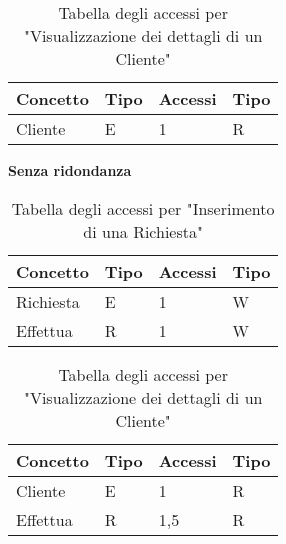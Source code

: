 \documentclass{article}
\begin{document}
\begin{table}[h]
    \centering
    \begin{adjustbox}{width=0.6\textwidth}
        \begin{tabular}{|m{2cm}|m{2cm}|m{2cm}|m{2cm}|}
            \hline  
            \textbf{Concetto} & \textbf{Tipo} & \textbf{Accessi} & \textbf{Tipo}\\ 
            \hline
            Cliente & E & 1 & R\\
            \hline
        \end{tabular}
    \end{adjustbox}
    \caption{Tabella degli accessi per "Visualizzazione dei dettagli di un Cliente"}
    \label{tab:accesstable2}
\end{table}

\textbf{Senza ridondanza}

\begin{table}[h]
    \centering
    \begin{adjustbox}{width=0.6\textwidth}
        \begin{tabular}{|m{2cm}|m{2cm}|m{2cm}|m{2cm}|}
            \hline  
            \textbf{Concetto} & \textbf{Tipo} & \textbf{Accessi} & \textbf{Tipo}\\ 
            \hline
            Richiesta & E & 1 & W\\
            \hline
            Effettua & R & 1 & W\\
            \hline
        \end{tabular}
    \end{adjustbox}
    \caption{Tabella degli accessi per "Inserimento di una Richiesta" }
    \label{tab:accesstable3}
\end{table}

\begin{table}[h!]
    \centering
    \begin{adjustbox}{width=0.6\textwidth}
        \begin{tabular}{|m{2cm}|m{2cm}|m{2cm}|m{2cm}|}
            \hline  
            \textbf{Concetto} & \textbf{Tipo} & \textbf{Accessi} & \textbf{Tipo}\\ 
            \hline
            Cliente & E & 1 & R\\
            \hline
            Effettua & R & 1,5 & R\\
            \hline
        \end{tabular}
    \end{adjustbox}
    \caption{Tabella degli accessi per "Visualizzazione dei dettagli di un Cliente"}
    \label{tab:accesstable4}
\end{table}
\end{document}
